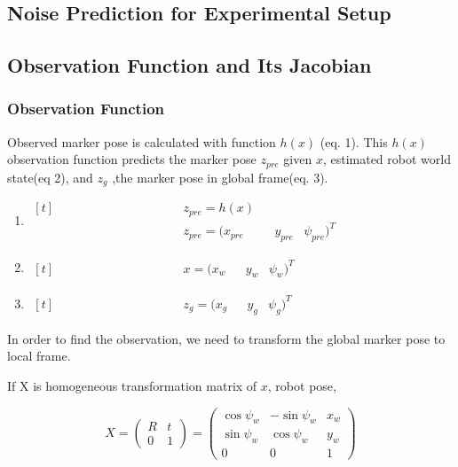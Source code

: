 \documentclass[14pt,a4paper]{article}
\begin{document}
	\subsection{Noise Prediction for Experimental Setup}	
	
	\subsection{Observation Function and Its Jacobian}
		\subsubsection{Observation Function}
	 	Observed marker pose is calculated with function $h(x)$ (eq. 1). This $h(x)$ observation function predicts the marker pose $z_{pre}$ given $x$, estimated robot world state(eq 2), and $z_{g}$ ,the marker pose in global frame(eq. 3).
		 
		\begin{enumerate}
		\item $\begin{aligned}[t]
		    &&&&&&&&&&&&& z_{pre}=h(x) \\
		    &&&&&&&&&&&&& z_{pre} = (x_{pre}&&y_{pre}&\psi_{pre})^T
		\end{aligned}$
		\item $\begin{aligned}[t]
		    &&&&&&&&&&&&& x = (x_{w}&&y_{w}&\psi_{w})^T
		\end{aligned}$
		\item $\begin{aligned}[t]
		    &&&&&&&&&&&&& z_{g} = (x_{g}&&y_{g}&\psi_{g})^T
		\end{aligned}$
		\end{enumerate}
	
		In order to find the observation, we need to transform the global marker pose to local frame.
		
		If X is homogeneous transformation matrix of $x$, robot pose,
		
		$$	X =	\begin{pmatrix} 
					R & t \\
					0 & 1 
				\end{pmatrix}
			=	\begin{pmatrix}
					\cos\psi_{w}	 &	-\sin\psi_{w} & x_{w}\\	
					\sin\psi_{w} &	\cos\psi_{w}	 & y_{w}\\
					0		 &		0	&	1
				\end{pmatrix}
		$$	
		
\end{document}
